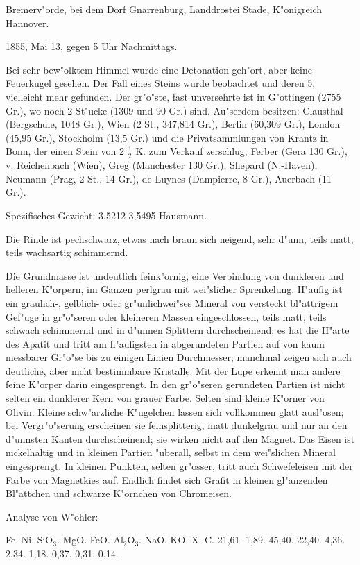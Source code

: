 \documentclass[a4paper, 11pt, oneside]{article}
\begin{document}
Bremerv"orde, bei dem Dorf Gnarrenburg, Landdrostei Stade, K"onigreich Hannover.

1855, Mai 13, gegen 5 Uhr Nachmittags.

Bei sehr bew"olktem Himmel wurde eine Detonation geh"ort, aber keine Feuerkugel gesehen. Der Fall eines Steins wurde beobachtet und deren 5, vielleicht mehr gefunden. Der gr"o"ste, fast unversehrte ist in G"ottingen (2755 Gr.), wo noch 2 St"ucke (1309 und 90 Gr.) sind. Au"serdem besitzen: Clausthal (Bergschule, 1048 Gr.), Wien (2 St., 347,814 Gr.), Berlin (60,309 Gr.), London (45,95 Gr.), Stockholm (13,5 Gr.) und die Privatsammlungen von Krantz in Bonn, der einen Stein von 2 $\frac{1}{2}$ K. zum Verkauf zerschlug, Ferber (Gera 130 Gr.), v. Reichenbach (Wien), Greg (Manchester 130 Gr.), Shepard (N.-Haven), Neumann (Prag, 2 St., 14 Gr.), de Luynes (Dampierre, 8 Gr.), Auerbach (11 Gr.).

Spezifisches Gewicht: 3,5212-3,5495 Hausmann.

Die Rinde ist pechschwarz, etwas nach braun sich neigend, sehr d"unn, teils matt, teils wachsartig schimmernd.

Die Grundmasse ist undeutlich feink"ornig, eine Verbindung von dunkleren und helleren K"orpern, im Ganzen perlgrau mit wei"slicher Sprenkelung. H"aufig ist ein graulich-, gelblich- oder gr"unlichwei"ses Mineral von versteckt bl"attrigem Gef"uge in gr"o"seren oder kleineren Massen eingeschlossen, teils matt, teils schwach schimmernd und in d"unnen Splittern durchscheinend; es hat die H"arte des Apatit und tritt am h"aufigsten in abgerundeten Partien auf von kaum messbarer Gr"o"se bis zu einigen Linien Durchmesser; manchmal zeigen sich auch deutliche, aber nicht bestimmbare Kristalle. Mit der Lupe erkennt man andere feine K"orper darin eingesprengt. In den gr"o"seren gerundeten Partien ist nicht selten ein dunklerer Kern von grauer Farbe. Selten sind kleine K"orner von Olivin. Kleine schw"arzliche K"ugelchen lassen sich vollkommen glatt ausl"osen; bei Vergr"o"serung erscheinen sie feinsplitterig, matt dunkelgrau und nur an den d"unnsten Kanten durchscheinend; sie wirken nicht auf den Magnet. Das Eisen ist nickelhaltig und in kleinen Partien "uberall, selbst in dem wei"slichen Mineral eingesprengt. In kleinen Punkten, selten gr"osser, tritt auch Schwefeleisen mit der Farbe von Magnetkies auf. Endlich findet sich Grafit in kleinen gl"anzenden Bl"attchen und schwarze K"ornchen von Chromeisen.

Analyse von W"ohler:

Fe. Ni. SiO$_{3}$. MgO. FeO. Al$_{2}$O$_{3}$. NaO. KO. X. C.  
21,61. 1,89. 45,40. 22,40. 4,36. 2,34. 1,18. 0,37. 0,31. 0,14.
\end{document}
